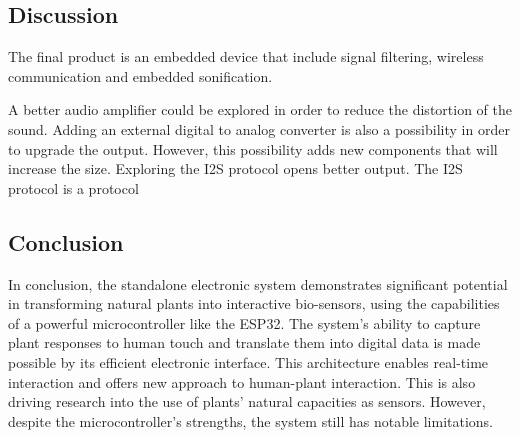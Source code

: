 

\subsection{Discussion}

The final product is an embedded device that include signal filtering, wireless communication and embedded sonification.





A better audio amplifier could be explored in order to reduce the distortion of the sound.
Adding an external digital to analog converter is also a possibility in order to upgrade the output. However,
this possibility adds new components that will increase the size. Exploring the I2S protocol opens better output.
The I2S protocol is a protocol  %


\subsection{Conclusion}

In conclusion, the standalone electronic system demonstrates significant potential in transforming natural plants into interactive bio-sensors, using the capabilities of a powerful microcontroller like the ESP32. The system's ability to capture plant responses to human touch and translate them into digital data is made possible by its efficient electronic interface. This architecture enables real-time interaction and offers new approach to human-plant interaction. This is also driving research into the use of plants' natural capacities as sensors. However, despite the microcontroller's strengths, the system still has notable limitations.

